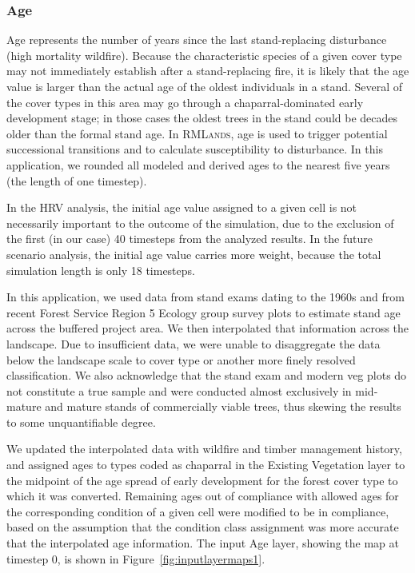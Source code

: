 


\subsubsection{Age}
Age represents the number of years since the last stand-replacing disturbance (high mortality wildfire). Because the characteristic species of a given cover type may not immediately establish after a stand-replacing fire, it is likely that the age value is larger than the actual age of the oldest individuals in a stand. Several of the cover types in this area may go through a chaparral-dominated early development stage; in those cases the oldest trees in the stand could be decades older than the formal stand age. In \textsc{RMLands}, age is used to trigger potential successional transitions and to calculate susceptibility to disturbance. In this application, we rounded all modeled and derived ages to the nearest five years (the length of one timestep).

In the HRV analysis, the initial age value assigned to a given cell is not necessarily important to the outcome of the simulation, due to the exclusion of the first (in our case) 40 timesteps from the analyzed results. In the future scenario analysis, the initial age value carries more weight, because the total simulation length is only 18 timesteps.

In this application, we used data from stand exams dating to the 1960s and from recent Forest Service Region 5 Ecology group survey plots to estimate stand age across the buffered project area. We then interpolated that information across the landscape. Due to insufficient data, we were unable to disaggregate the data below the landscape scale to cover type or another more finely resolved classification. We also acknowledge that the stand exam and modern veg plots do not constitute a true sample and were conducted almost exclusively in mid-mature and mature stands of commercially viable trees, thus skewing the results to some unquantifiable degree.

We updated the interpolated data with wildfire and timber management history, and assigned ages to types coded as chaparral in the Existing Vegetation layer to the midpoint of the age spread of early development for the forest cover type to which it was converted. Remaining ages out of compliance with allowed ages for the corresponding condition of a given cell were modified to be in compliance, based on the assumption that the condition class assignment was more accurate that the interpolated age information. The input Age layer, showing the map at timestep 0, is shown in Figure~\ref{fig:inputlayermaps1}.


